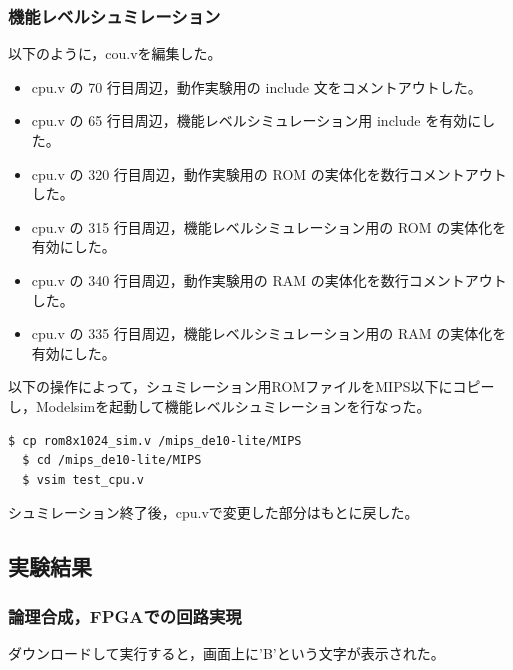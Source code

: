 \subsubsection{機能レベルシュミレーション}
以下のように，cou.vを編集した。
\begin{itemize}
  \item cpu.v の 70 行目周辺，動作実験用の include 文をコメントアウトした。
  \item cpu.v の 65 行目周辺，機能レベルシミュレーション用 include を有効にした。
  \item cpu.v の 320 行目周辺，動作実験用の ROM の実体化を数行コメントアウトした。
  \item cpu.v の 315 行目周辺，機能レベルシミュレーション用の ROM の実体化を有効にした。
  \item cpu.v の 340 行目周辺，動作実験用の RAM の実体化を数行コメントアウトした。
  \item cpu.v の 335 行目周辺，機能レベルシミュレーション用の RAM の実体化を有効にした。
\end{itemize}

以下の操作によって，シュミレーション用ROMファイルをMIPS以下にコピーし，Modelsimを起動して機能レベルシュミレーションを行なった。

\begin{lstlisting}[caption={機能レベルシュミレーション},label={機能レベルシュミレーション1－2}]
  $ cp rom8x1024_sim.v /mips_de10-lite/MIPS
  $ cd /mips_de10-lite/MIPS
  $ vsim test_cpu.v
\end{lstlisting}

シュミレーション終了後，cpu.vで変更した部分はもとに戻した。

\subsection{実験結果}
\subsubsection{論理合成，FPGAでの回路実現}
ダウンロードして実行すると，画面上に'B'という文字が表示された。

